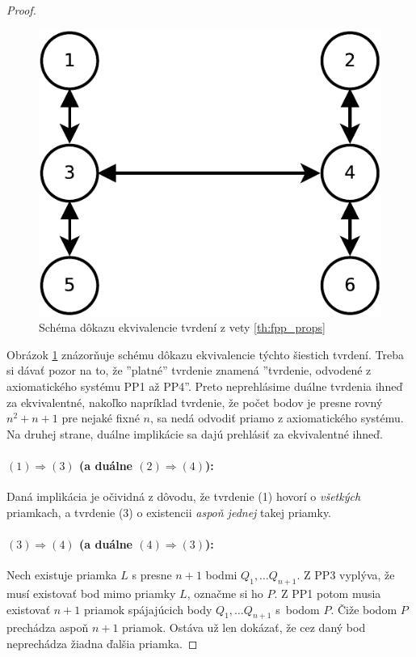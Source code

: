 \begin{proof}
\begin{figure}
    \centering
    \includegraphics[scale=0.7]{fpp-proof-scheme.pdf}
    \caption{Schéma dôkazu ekvivalencie tvrdení z vety \ref{th:fpp_props}}
    \label{fig:fpp_props_scheme}
\end{figure}
Obrázok \ref{fig:fpp_props_scheme} znázorňuje schému dôkazu ekvivalencie týchto šiestich tvrdení.
Treba si dávať pozor na to, že ''platné'' tvrdenie znamená ''tvrdenie, odvodené z axiomatického systému PP1 až PP4''.
Preto neprehlásime duálne tvrdenia ihneď za ekvivalentné, nakoľko napríklad tvrdenie, že počet bodov je presne rovný $n^2 + n + 1$ pre nejaké fixné $n$, sa nedá odvodiť priamo z axiomatického systému.
Na druhej strane, duálne implikácie sa dajú prehlásiť za ekvivalentné ihneď.

\paragraph{$(1) \Longrightarrow (3)$ (a duálne $(2) \Longrightarrow (4)$):} Daná implikácia je očividná z dôvodu, že tvrdenie (1) hovorí o \emph{všetkých} priamkach, a tvrdenie (3) o existencii \emph{aspoň jednej} takej priamky.

\paragraph{$(3) \Longrightarrow (4)$ (a duálne $(4) \Longrightarrow (3)$):} 
Nech existuje priamka $L$ s presne $n+1$ bodmi $Q_1, \ldots Q_{n+1}$. 
Z PP3 vyplýva, že musí existovať bod mimo priamky $L$, označme si ho $P$. 
Z PP1 potom musia existovať $n+1$ priamok spájajúcich body  $Q_1, \ldots Q_{n+1}$ s~bodom $P$. 
Čiže bodom $P$ prechádza aspoň $n+1$ priamok. 
Ostáva už len dokázať, že cez daný bod neprechádza žiadna ďalšia priamka. 


\end{proof}
